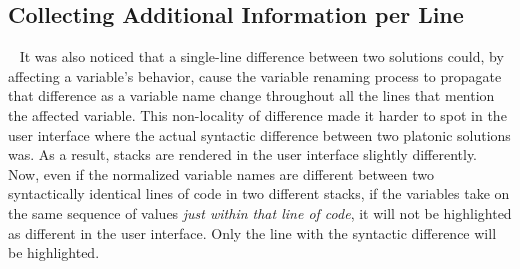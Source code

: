 \subsection{Collecting Additional Information per Line}~\label{subsec:morelineinfo}
It was also noticed that a single-line difference between two solutions could, by affecting a variable's behavior, cause the variable renaming process to propagate that difference as a variable name change throughout all the lines that mention the affected variable. This non-locality of difference made it harder to spot in the user interface where the actual syntactic difference between two platonic solutions was. As a result, stacks are rendered in the user interface slightly differently. Now, even if the normalized variable names are different between two syntactically identical lines of code in two different stacks, if the variables take on the same sequence of values {\it just within that line of code}, it will not be highlighted as different in the user interface. Only the line with the syntactic difference will be highlighted.


